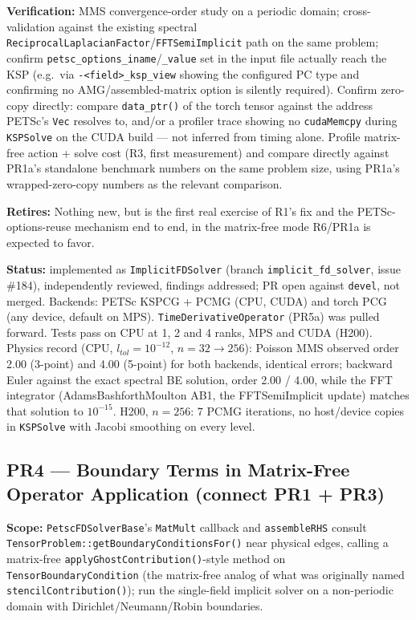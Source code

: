\documentclass[11pt]{article}
\newcommand{\pr}[2]{\subsection{PR#1 --- #2}}
\newcommand{\status}[1]{\textcolor{marlinteal}{\textbf{Status:}} #1}
\begin{document}
\textbf{Verification:} MMS convergence-order study on a periodic domain;
cross-validation against the existing spectral
\texttt{ReciprocalLaplacianFactor}/\texttt{FFTSemiImplicit} path on the same
problem; confirm \texttt{petsc\_options\_iname}/\texttt{\_value} set in the
input file actually reach the KSP (e.g.\ via \texttt{-<field>\_ksp\_view}
showing the configured PC type and confirming no AMG/assembled-matrix
option is silently required). Confirm zero-copy directly: compare
\texttt{data\_ptr()} of the torch tensor against the address PETSc's
\texttt{Vec} resolves to, and/or a profiler trace showing no
\texttt{cudaMemcpy} during \texttt{KSPSolve} on the CUDA build --- not
inferred from timing alone. Profile matrix-free action + solve cost (R3,
first measurement) and compare directly against PR1a's standalone benchmark
numbers on the same problem size, using PR1a's wrapped-zero-copy numbers as
the relevant comparison.

\textbf{Retires:} Nothing new, but is the first real exercise of R1's fix
and the PETSc-options-reuse mechanism end to end, in the matrix-free mode
R6/PR1a is expected to favor.

\status{implemented as \texttt{ImplicitFDSolver} (branch \texttt{implicit\_fd\_solver}, issue \#184),
independently reviewed, findings addressed; PR open against \texttt{devel}, not merged.
Backends: PETSc KSPCG + PCMG (CPU, CUDA) and torch PCG (any device, default on MPS).
\texttt{TimeDerivativeOperator} (PR5a) was pulled forward. Tests pass on CPU at 1, 2 and 4 ranks,
MPS and CUDA (H200). Physics record (CPU, $l_{tol}=10^{-12}$, $n=32\to256$): Poisson MMS
observed order 2.00 (3-point) and 4.00 (5-point) for both backends, identical errors;
backward Euler against the exact spectral BE solution, order 2.00 / 4.00, while the FFT
integrator (AdamsBashforthMoulton AB1, the FFTSemiImplicit update) matches that solution to
$10^{-15}$. H200, $n=256$: 7 PCMG iterations, no host/device copies in \texttt{KSPSolve}
with Jacobi smoothing on every level.}

\pr{4}{Boundary Terms in Matrix-Free Operator Application (connect PR1 + PR3)}
\textbf{Scope:} \texttt{PetscFDSolverBase}'s \texttt{MatMult} callback and
\texttt{assembleRHS} consult \texttt{TensorProblem::getBoundaryConditionsFor()}
near physical edges, calling a matrix-free
\texttt{applyGhostContribution()}-style method on
\texttt{TensorBoundaryCondition} (the matrix-free analog of what was
originally named \texttt{stencilContribution()}); run the single-field
implicit solver on a non-periodic domain with Dirichlet/Neumann/Robin
boundaries.
\end{document}
